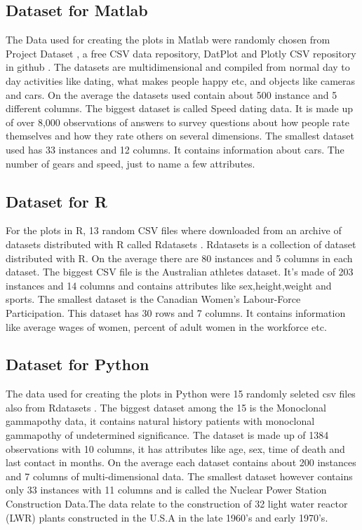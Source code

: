 \documentclass[12pt, a4paper,oneside]{report}
\begin{document}
\subsection{Dataset for Matlab}
The Data used for creating the plots in Matlab were randomly chosen from Project Dataset \cite{projectdataset}, a free CSV data repository, DatPlot \cite{datplot} and Plotly CSV repository in github \cite{plotly}. The datasets are multidimensional and compiled from normal day to day activities like dating, what makes people happy etc, and objects like cameras and cars. On the average the datasets used contain about 500 instance and 5 different columns. The biggest dataset is called Speed dating data. It is made up of over 8,000 observations of answers to survey questions about how people rate themselves and how they rate others on several dimensions. The smallest dataset used has 33 instances and 12 columns. It contains information about cars. The number of gears and speed, just to name a few attributes.

\subsection{Dataset for R}
For the plots in R, 13 random CSV files where downloaded from an archive of datasets distributed with R called Rdatasets  \cite{rdata}. Rdatasets is a collection of dataset distributed with R. On the average there are 80 instances and 5 columns in each dataset.
The biggest CSV file is the Australian athletes dataset. It's made of 203 instances and 14 columns and contains attributes like sex,height,weight and sports. The smallest dataset is the Canadian Women's Labour-Force Participation. This dataset has 30 rows and 7 columns. It contains information like average wages of women, percent of adult women in the workforce etc.


\subsection{Dataset for Python}
The data used for creating the plots in Python were 15 randomly seleted csv files also from  Rdatasets \cite{rdata}. The biggest dataset among the 15 is the Monoclonal gammapothy data, it contains natural history patients with monoclonal gammapothy of undetermined significance. The dataset is made up of 1384 observations with 10 columns, it has attributes like age, sex, time of death and last contact in months. On the average each dataset contains about 200 instances and 7 columns of multi-dimensional data. The smallest dataset however contains only 33 instances with 11 columns and is called the Nuclear Power Station Construction Data.The data relate to the construction of 32 light water reactor (LWR) plants constructed in the U.S.A in the late 1960's and early 1970's.
\end{document}
